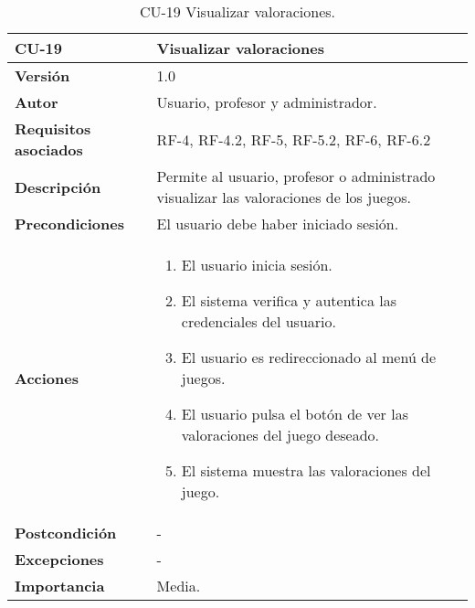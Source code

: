 \begin{table}[h!]
	\centering
	\begin{tabularx}{\linewidth}{ p{} p{} }
		\toprule
		\textbf{CU-19}    & \textbf{Visualizar valoraciones}\\
		\toprule
		\textbf{Versión}              & 1.0    \\
		\textbf{Autor}                & Usuario, profesor y administrador. \\
		\textbf{Requisitos asociados} & RF-4, RF-4.2, RF-5, RF-5.2, RF-6, RF-6.2 \\
		\textbf{Descripción}          & Permite al usuario, profesor o administrado visualizar las valoraciones de los juegos.\\
		\textbf{Precondiciones}         & El usuario debe haber iniciado sesión. \\
		\textbf{Acciones}             &
		\begin{enumerate}
			\def\labelenumi{\arabic{enumi}.}
			\tightlist
			\item El usuario inicia sesión.
            \item El sistema verifica y autentica las credenciales del usuario.
            \item El usuario es redireccionado al menú de juegos.
            \item El usuario pulsa el botón de ver las valoraciones del juego deseado.
            \item El sistema muestra las valoraciones del juego.
		\end{enumerate}\\
         \textbf{Postcondición}             & - \\
		\textbf{Excepciones}             & - \\
		\textbf{Importancia}          & Media. \\
		\bottomrule
	\end{tabularx}
	\caption{CU-19 Visualizar valoraciones.}
\end{table}


